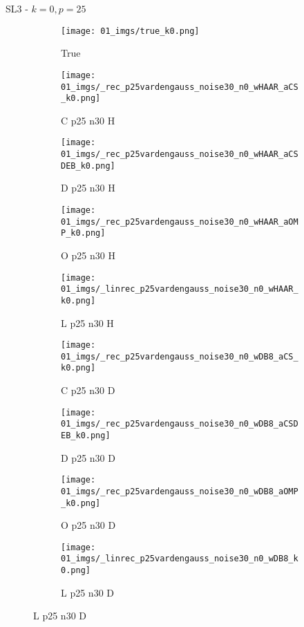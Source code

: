 \begin{frame}{SL3 - $k=0,p=25$}{}
\begin{figure}
\begin{subfigure}{0.1\textwidth}
\texttt{[image: 01\_imgs/true\_k0.png]}
\caption*{\Tiny True}
\end{subfigure}
\begin{subfigure}{0.1\textwidth}
\texttt{[image: 01\_imgs/\_rec\_p25vardengauss\_noise30\_n0\_wHAAR\_aCS\_k0.png]}
\caption*{\Tiny C p25 n30 H}
\end{subfigure}
\begin{subfigure}{0.1\textwidth}
\texttt{[image: 01\_imgs/\_rec\_p25vardengauss\_noise30\_n0\_wHAAR\_aCSDEB\_k0.png]}
\caption*{\Tiny D p25 n30 H}
\end{subfigure}
\begin{subfigure}{0.1\textwidth}
\texttt{[image: 01\_imgs/\_rec\_p25vardengauss\_noise30\_n0\_wHAAR\_aOMP\_k0.png]}
\caption*{\Tiny O p25 n30 H}
\end{subfigure}
\begin{subfigure}{0.1\textwidth}
\texttt{[image: 01\_imgs/\_linrec\_p25vardengauss\_noise30\_n0\_wHAAR\_k0.png]}
\caption*{\Tiny L p25 n30 H}
\end{subfigure}
\begin{subfigure}{0.1\textwidth}
\texttt{[image: 01\_imgs/\_rec\_p25vardengauss\_noise30\_n0\_wDB8\_aCS\_k0.png]}
\caption*{\Tiny C p25 n30 D}
\end{subfigure}
\begin{subfigure}{0.1\textwidth}
\texttt{[image: 01\_imgs/\_rec\_p25vardengauss\_noise30\_n0\_wDB8\_aCSDEB\_k0.png]}
\caption*{\Tiny D p25 n30 D}
\end{subfigure}
\begin{subfigure}{0.1\textwidth}
\texttt{[image: 01\_imgs/\_rec\_p25vardengauss\_noise30\_n0\_wDB8\_aOMP\_k0.png]}
\caption*{\Tiny O p25 n30 D}
\end{subfigure}
\begin{subfigure}{0.1\textwidth}
\texttt{[image: 01\_imgs/\_linrec\_p25vardengauss\_noise30\_n0\_wDB8\_k0.png]}
\caption*{\Tiny L p25 n30 D}
\end{subfigure}
\end{figure}
\end{frame}

